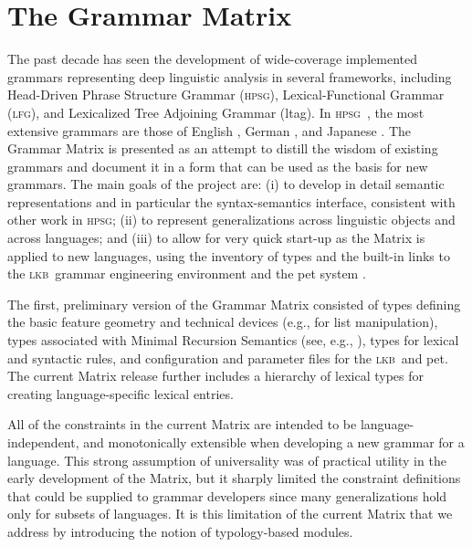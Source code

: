 \documentclass[11pt]{article}
\newcommand{\hpsg}{\textsc{hpsg}}
\newcommand{\lkb}{\textsc{lkb}}
\newcommand{\lfg}{\textsc{lfg}}
\begin{document}
\section{The Grammar Matrix}

The past decade has seen the development of wide-coverage implemented
grammars representing deep linguistic analysis in
several frameworks, including Head-Driven Phrase Structure Grammar
(\hpsg), Lexical-Functional Grammar (\lfg), and Lexicalized Tree
Adjoining Grammar ({\sc ltag}). In \hpsg\ \cite{Pol:Sag:94}, the most
extensive grammars are those of English \cite{Flickinger:00}, German
\cite{Hinrichs:etal:97,Mue:Kap:00,Crysmannip}, and Japanese \cite{Siegel:00,Siegel:Bender:02}.
The Grammar Matrix \cite{Ben:Fli:Oe:02} is presented as 
an attempt to distill the
wisdom of existing grammars and document it in a form that can
be used as the basis for new grammars. The main goals of the project
are: (i) to develop in detail semantic representations and in particular 
the syntax-semantics interface, consistent with other work in \hpsg; 
(ii) to represent generalizations across linguistic objects
and across languages; and (iii) to allow for very quick start-up as 
the Matrix is applied to new languages, using the inventory of types and
the built-in links to the \lkb\ grammar engineering environment
\cite{Copestake:02} and the {\sc pet} system \cite{Callmeier:00}.

The first, preliminary version of the Grammar Matrix 
consisted of types defining the basic feature geometry and technical
devices (e.g., for list manipulation), types associated with Minimal
Recursion Semantics (see, e.g., \cite{Cop:Las:Fli:01}), types for
lexical and syntactic rules, and configuration and parameter
files for the \lkb\ and {\sc pet}.  The current Matrix release further 
includes a hierarchy of lexical types for creating language-specific 
lexical entries.

All of the constraints in the current Matrix are intended to be 
language-independent, and monotonically extensible when developing a
new grammar for a language.
This strong 
assumption of universality was of practical utility in the early
development of the Matrix, but it sharply limited the 
constraint definitions that could be supplied to grammar developers
since many generalizations hold only for subsets of languages.  It is
this limitation of the current Matrix that we address by introducing
the notion of typology-based modules.
\end{document}
